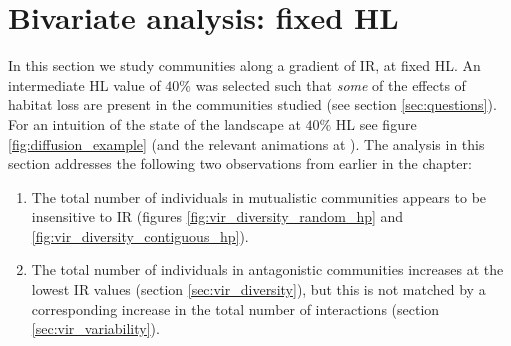 \section{Bivariate analysis: fixed HL}
\label{sec:biv_fixHL}

In this section we study communities along a gradient of IR, at fixed HL. An intermediate HL value of $40\%$ was selected such that \emph{some} of the effects of habitat loss are present in the communities studied (see section \ref{sec:questions}). For an intuition of the state of the landscape at $40\%$ HL see figure \ref{fig:diffusion_example} (and the relevant animations at \cite{mcwilliams2015anim}). The analysis in this section addresses the following two observations from earlier in the chapter:
\begin{enumerate}
	\item The total number of individuals in mutualistic communities appears to be insensitive to IR (figures \ref{fig:vir_diversity_random_hp} and \ref{fig:vir_diversity_contiguous_hp}).
	\item The total number of individuals in antagonistic communities increases at the lowest IR values (section \ref{sec:vir_diversity}), but this is not matched by a corresponding increase in the total number of interactions (section \ref{sec:vir_variability}).
\end{enumerate}

%
%

